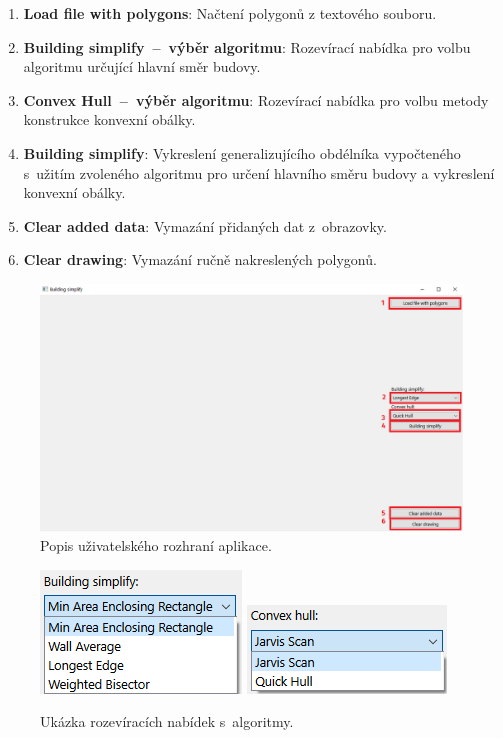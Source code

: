 \documentclass[a4paper, 12pt, oneside, titlepage]{article} %
\begin{document}
\begin{enumerate}
\item \textbf{Load file with polygons}: Načtení polygonů z textového souboru. 
\item \textbf{Building simplify~--~výběr algoritmu}: Rozevírací nabídka pro volbu algoritmu určující hlavní směr budovy. 
\item \textbf{Convex Hull~--~výběr algoritmu}: Rozevírací nabídka pro volbu metody konstrukce konvexní obálky.
\item \textbf{Building simplify}: Vykreslení generalizujícího obdélníka vypočteného s~užitím zvoleného algoritmu pro určení hlavního směru budovy a vykreslení konvexní obálky.
\item \textbf{Clear added data}: Vymazání přidaných dat z~obrazovky.
\item \textbf{Clear drawing}: Vymazání ručně nakreslených polygonů.
\end{enumerate}


\begin{figure}[!htb]
	\centering
	\includegraphics[scale=0.5]{obrazky/popis_ui.png} 
	\caption{Popis uživatelského rozhraní aplikace.
	}
	\label{fig:popis_ui}
\end{figure} 
\FloatBarrier

\begin{figure}[!htb]
	\centering
	\includegraphics[scale=1]{obrazky/alg_vyber.png} 
	\includegraphics[scale=1]{obrazky/ch_vyber.png} 
	\caption{Ukázka rozevíracích nabídek s~algoritmy.
	}
	\label{fig:vyber}
\end{figure} 
\FloatBarrier
\end{document}
